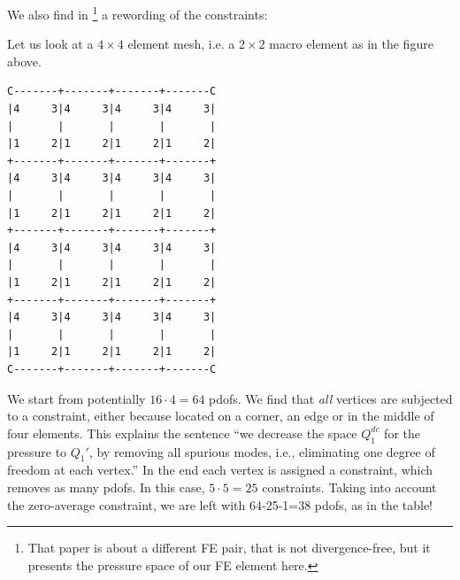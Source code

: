 We also find in \textcite{zhmu16}\footnote{That paper is about a different 
FE pair, that is not divergence-free, but it presents the pressure space
of our FE element here.} a rewording of the constraints:
\begin{center}
\end{center}

Let us look at a $4\times 4$ element mesh, i.e. a $2\times 2$ macro element as in the figure above. 
\begin{verbatim}
C-------+-------+-------+-------C
|4     3|4     3|4     3|4     3|
|       |       |       |       |
|1     2|1     2|1     2|1     2|
+-------+-------+-------+-------+
|4     3|4     3|4     3|4     3|
|       |       |       |       |
|1     2|1     2|1     2|1     2|
+-------+-------+-------+-------+
|4     3|4     3|4     3|4     3|
|       |       |       |       |
|1     2|1     2|1     2|1     2|
+-------+-------+-------+-------+
|4     3|4     3|4     3|4     3|
|       |       |       |       |
|1     2|1     2|1     2|1     2|
C-------+-------+-------+-------C
\end{verbatim}
We start from potentially $16\cdot 4=64$ pdofs. We find that 
{\it all} vertices are subjected to a constraint, either because located on a 
corner, an edge or in the middle of four elements. 
This explains the sentence 
{\color{darkgray} ``we decrease the space $Q_1^{dc}$ for the pressure to $Q_1'$, by removing 
all spurious modes, i.e., eliminating one degree of freedom at each vertex.''}
In the end each vertex is assigned a constraint, which removes as many 
pdofs. In this case, $5\cdot 5=25$ constraints. Taking into account the zero-average
constraint, we are left with 64-25-1=38 pdofs, as in the table!

